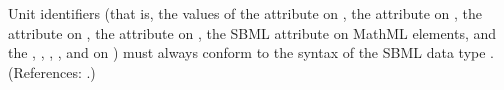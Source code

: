 Unit identifiers (that is, the values of the  attribute on
\UnitDefinition, the  attribute on \Compartment, the
 attribute on \Parameter,  the  attribute
on \Species, the SBML  attribute on MathML 
elements, and the , ,
, ,  and
 on \Model) must always conform to the syntax of the
SBML data type .  (References: .)
